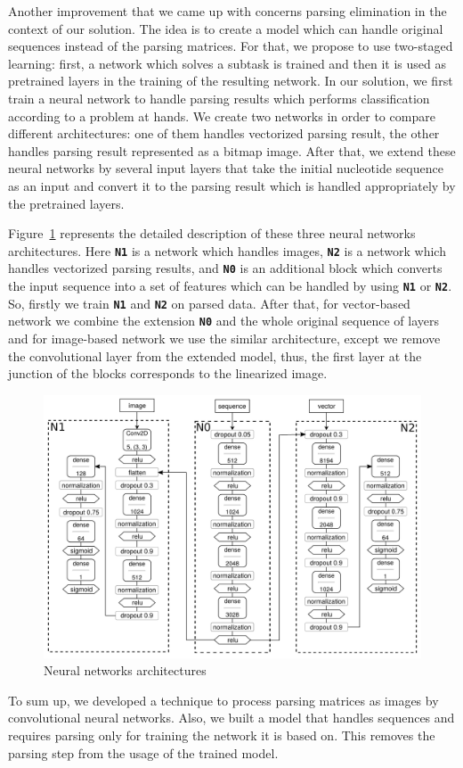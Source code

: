Another improvement that we came up with concerns parsing elimination in the context of our solution. 
The idea is to create a model which can handle original sequences instead of the parsing matrices. For that, we propose to use two-staged learning: first, a network which solves a subtask is trained and then it is used as pretrained layers in the training of the resulting network.
In our solution, we first train a neural network to handle parsing results which performs classification according to a problem at hands. We create two networks in order to compare different architectures: one of them handles vectorized parsing result, the other handles parsing result represented as a bitmap image. After that, we extend these neural networks by several input layers that take the initial nucleotide sequence as an input and convert it to the parsing result which is handled appropriately by the pretrained layers.

Figure~\ref{nn} represents the detailed description of these three neural networks architectures.
Here \textbf{\texttt{N1}} is a network which handles images, \textbf{\texttt{N2}} is a network which handles vectorized parsing results, and \textbf{\texttt{N0}} is an additional block which converts the input sequence into a set of features which can be handled by using \textbf{\texttt{N1}} or \textbf{\texttt{N2}}. So, firstly we train \textbf{\texttt{N1}} and \textbf{\texttt{N2}} on parsed data. After that, for vector-based network we combine the extension \textbf{\texttt{N0}} and the whole original sequence of layers and for image-based network we use the similar architecture, except we remove the convolutional layer from the extended model, thus, the first layer at the junction of the blocks corresponds to the linearized image.

\begin{figure}[h]
\begin{center}
\centering
\includegraphics[width=12cm]{figures/nn_arch.pdf}
\caption{Neural networks architectures}
\label{nn}
\end{center}
\end{figure}

To sum up, we developed a technique to process parsing matrices as images by convolutional neural networks. Also, we built a model that handles sequences and requires parsing only for training the network it is based on. This removes the parsing step from the usage of the trained model.
